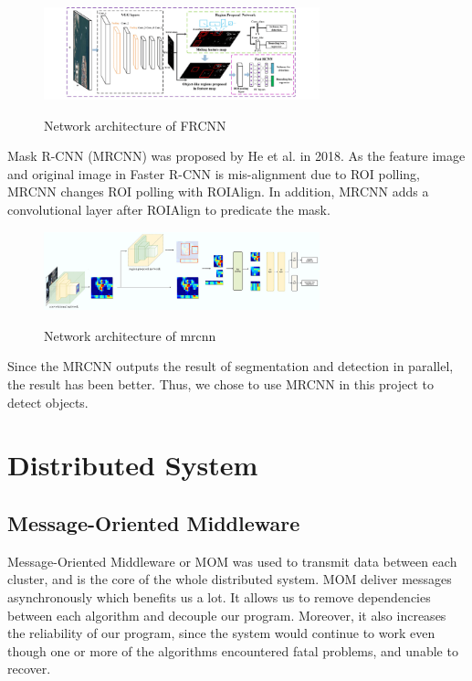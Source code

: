\documentclass[runningheads]{llncs}
\begin{document}
\begin{figure}
    \centering
    \includegraphics[width=8cm]{reference/frcnn}
    \label{fig:FRCNN}
    \caption{Network architecture of FRCNN}
\end{figure}

Mask R-CNN\cite{MaskRCNN} (MRCNN) was proposed by He et al. 
in 2018. As the feature image and original image in Faster 
R-CNN is mis-alignment due to ROI polling, MRCNN changes ROI 
polling with ROIAlign. In addition, MRCNN adds a 
convolutional layer after ROIAlign to predicate the mask. 

\begin{figure}
    \centering
    \includegraphics[width=8cm]{reference/mrcnn}
    \label{fig:MRCNN}
    \caption{Network architecture of mrcnn}
\end{figure}

Since the MRCNN outputs the result of segmentation and 
detection in parallel, the result has been better. Thus, 
we chose to use MRCNN in this project to detect objects.


\section{Distributed System}

\subsection{Message-Oriented Middleware}
Message-Oriented Middleware or MOM was used to transmit 
data between each cluster, and is the core of the whole 
distributed system. MOM deliver messages asynchronously 
which benefits us a lot. It allows us to remove 
dependencies between each algorithm and decouple our 
program. Moreover, it also increases the reliability of our 
program, since the system would continue to work even 
though one or more of the algorithms encountered fatal 
problems, and unable to recover.
\end{document}
